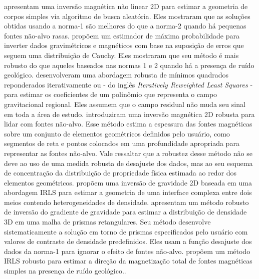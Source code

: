 \citet{silva_hohmann1983} apresentam uma inversão magnética não linear 2D para estimar a geometria de corpos simples via algoritmo de busca aleatória. Eles mostraram que as soluções obtidas usando a norma-1 são melhores do que a norma-2 quando há pequenas fontes não-alvo rasas. 
\citet{silva_cutrim1989} propõem um estimador de máxima probabilidade para inverter dados gravimétricos e magnéticos com base na suposição de erros que seguem uma distribuição de Cauchy.
Eles mostraram que seu método é mais robusto do que aqueles baseados nas normas 1 e 2 quando há a presença de ruído geológico.
\citet{beltrao_etal1991} desenvolveram uma abordagem robusta de mínimos quadrados reponderados iterativamente ou - do inglês \textit{Iteratively Reweighted Least Squares} - \citep{scales_gersztenkorn1988} para estimar os coeficientes de um polinômio que representa o campo gravitacional regional. 
Eles assumem que o campo residual não muda seu sinal em toda a área de estudo. 
\citet{barbosa_silva2006} introduziram uma inversão magnética 2D robusta para lidar com fontes não-alvo. Esse método estima a espessura das fontes magnéticas sobre um conjunto de elementos geométricos definidos pelo usuário, como segmentos de reta e pontos colocados em uma profundidade apropriada para representar as fontes não-alvo. 
Vale ressaltar que a robustez desse método não se deve ao uso de uma medida robusta de desajuste dos dados, mas ao seu esquema de concentração da distribuição de propriedade física estimada ao redor dos elementos geométricos. 
\citet{silva_dias_etal2007} propõem uma inversão de gravidade 2D baseada em uma abordagem IRLS para estimar a geometria de uma interface complexa entre dois meios contendo
heterogeneidades de densidade. 
\citet{uieda_barbosa2012} apresentam um método robusto de inversão do gradiente de gravidade para estimar a distribuição de densidade 3D em uma malha de prismas retangulares.
Seu método desenvolve sistematicamente a solução em torno de prismas especificados pelo usuário com valores de contraste de densidade predefinidos. Eles usam a função desajuste dos dados da norma-1 para ignorar o efeito de fontes não-alvo.
\citet{oliveirajr_etal2015} propõem um método IRLS robusto para estimar a direção da magnetização total de fontes magnéticas simples na presença de ruído geológico..

